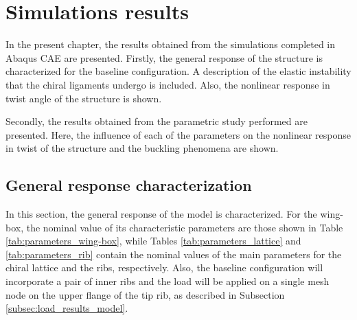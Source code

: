 \chapter{Simulations results} \label{chap:results_sim}
  
  In the present chapter, the results obtained from the simulations completed in Abaqus CAE are presented. Firstly, the general response of the structure is characterized for the baseline configuration. A description of the elastic instability that the chiral ligaments undergo is included. Also, the nonlinear response in twist angle of the structure is shown.

  Secondly, the results obtained from the parametric study performed are presented. Here, the influence of each of the parameters on the nonlinear response in twist of the structure and the buckling phenomena are shown.

\section{General response characterization} \label{sec:generalResponseCharact_results_sim}

  In this section, the general response of the model is characterized. For the wing-box, the nominal value of its characteristic parameters are those shown in Table \ref{tab:parameters_wing-box}, while Tables \ref{tab:parameters_lattice} and \ref{tab:parameters_rib} contain the nominal values of the main parameters for the chiral lattice and the ribs, respectively. Also, the baseline configuration will incorporate a pair of inner ribs and the load will be applied on a single mesh node on the upper flange of the tip rib, as described in Subsection \ref{subsec:load_results_model}.

